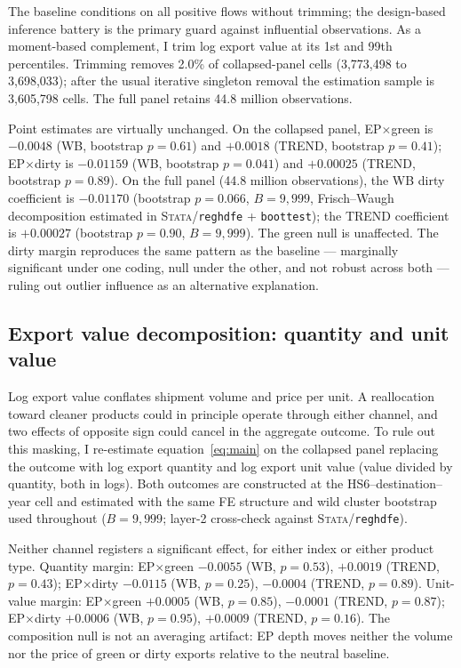 \documentclass[12pt]{article}
\begin{document}
The baseline conditions on all positive flows without trimming; the design-based
inference battery is the primary guard against influential observations. As a
moment-based complement, I trim log export value at its 1st and 99th percentiles.
Trimming removes 2.0\% of collapsed-panel cells (3,773,498 to 3,698,033); after the
usual iterative singleton removal the estimation sample is 3,605,798 cells. The full
panel retains 44.8 million observations.

Point estimates are virtually unchanged. On the collapsed panel, EP$\times$green
is $-0.0048$ (WB, bootstrap $p=0.61$) and $+0.0018$ (TREND, bootstrap $p=0.41$);
EP$\times$dirty is $-0.01159$ (WB, bootstrap $p=0.041$) and $+0.00025$ (TREND,
bootstrap $p=0.89$). On the full panel (44.8 million observations), the WB dirty coefficient is
$-0.01170$ (bootstrap $p=0.066$, $B=9{,}999$, Frisch--Waugh decomposition
estimated in \textsc{Stata}/\texttt{reghdfe} + \texttt{boottest}); the TREND
coefficient is $+0.00027$ (bootstrap $p=0.90$, $B=9{,}999$). The green null is
unaffected. The dirty margin reproduces the same pattern as the baseline ---
marginally significant under one coding, null under the other, and not robust
across both --- ruling out outlier influence as an alternative explanation.

\subsection{Export value decomposition: quantity and unit value}

Log export value conflates shipment volume and price per unit. A reallocation
toward cleaner products could in principle operate through either channel, and two
effects of opposite sign could cancel in the aggregate outcome. To rule out this
masking, I re-estimate equation~\eqref{eq:main} on the collapsed panel replacing
the outcome with log export quantity and log export unit value (value divided by
quantity, both in logs). Both outcomes are constructed at the HS6--destination--year
cell and estimated with the same FE structure and wild cluster bootstrap used
throughout ($B=9{,}999$; layer-2 cross-check against \textsc{Stata}/\texttt{reghdfe}).

Neither channel registers a significant effect, for either index or either product
type. Quantity margin: EP$\times$green $-0.0055$ (WB, $p=0.53$), $+0.0019$
(TREND, $p=0.43$); EP$\times$dirty $-0.0115$ (WB, $p=0.25$), $-0.0004$
(TREND, $p=0.89$). Unit-value margin: EP$\times$green $+0.0005$ (WB, $p=0.85$),
$-0.0001$ (TREND, $p=0.87$); EP$\times$dirty $+0.0006$ (WB, $p=0.95$),
$+0.0009$ (TREND, $p=0.16$). The composition null is not an averaging artifact:
EP depth moves neither the volume nor the price of green or dirty exports relative
to the neutral baseline.
\end{document}
